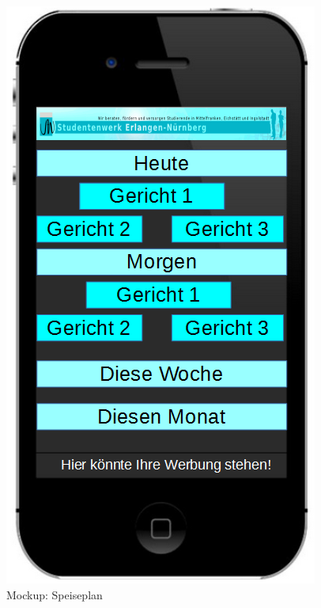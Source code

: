 \begin{figure}[h]
    \centering
    \includegraphics[scale=0.4]{./inc/aufgabe05/MockupSpeiseplan}
    \caption{Mockup: Speiseplan}
\end{figure}

